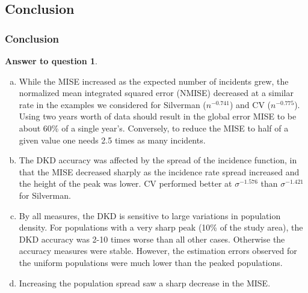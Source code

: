 \documentclass[notheorems]{beamer}
\theoremstyle{definition}
\newtheorem{answer}{Answer to question}
\theoremstyle{example}
\begin{document}
\subsection{Conclusion}
\begin{frame}\frametitle{Conclusion}
    \footnotesize
    \begin{answer}
        \begin{enumerate}[a)]
            \item
                While the MISE increased as the expected number of incidents grew,
                the normalized mean integrated squared error (NMISE) decreased at a similar rate in the examples we considered
                for Silverman ($n^{-0.741}$) and CV ($n^{-0.775}$).
                Using two years worth of data should result in the global error MISE to be about 60\% of a single year's.
                Conversely, to reduce the MISE to half of a given value one needs 2.5 times as many incidents.
            \item
                The DKD accuracy was affected by the spread of the incidence function,
                in that the MISE decreased sharply as the incidence rate spread increased and the height of the peak was lower.
                CV performed better at $\sigma^{-1.576}$ than $\sigma^{-1.421}$ for Silverman.
            \item
                By all measures, the DKD is sensitive to large variations in population density.
                For populations with a very sharp peak (10\% of the study area),
                the DKD accuracy was 2-10 times worse than all other cases.
                Otherwise the accuracy measures were stable.
                However, the estimation errors observed for the uniform populations were much lower than the peaked populations.
            \item
                Increasing the population spread saw a sharp decrease in the MISE.
        \end{enumerate}
    \end{answer}
\end{frame}

\end{document}
